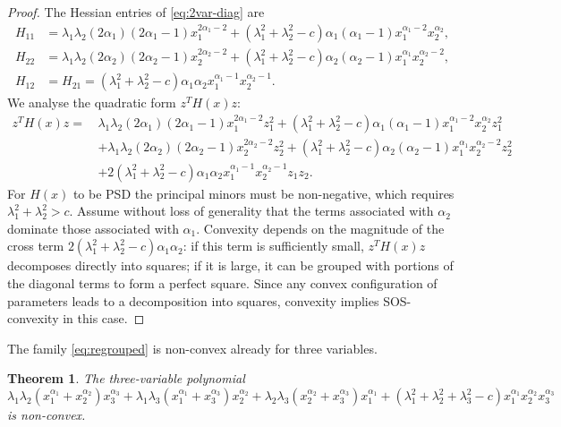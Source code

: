 \documentclass[12pt]{elsarticle}
\newtheorem{theorem}{Theorem}[section]
\theoremstyle{definition}
\begin{document}
\begin{proof}
The Hessian entries of \eqref{eq:2var-diag} are
\begin{equation}\label{eq:hessian-diag}
\begin{aligned}
H_{11} &= \lambda_1\lambda_2(2\alpha_1)(2\alpha_1 - 1)x_1^{2\alpha_1 - 2} + (\lambda_1^2 + \lambda_2^2 - c)\alpha_1(\alpha_1 - 1)x_1^{\alpha_1 - 2}x_2^{\alpha_2},\\
H_{22} &= \lambda_1\lambda_2(2\alpha_2)(2\alpha_2 - 1)x_2^{2\alpha_2 - 2} + (\lambda_1^2 + \lambda_2^2 - c)\alpha_2(\alpha_2 - 1)x_1^{\alpha_1}x_2^{\alpha_2 - 2},\\
H_{12}&=H_{21} = (\lambda_1^2 + \lambda_2^2 - c)\alpha_1\alpha_2 x_1^{\alpha_1 - 1}x_2^{\alpha_2 - 1}.
\end{aligned}
\end{equation}
We analyse the quadratic form $z^{T}H(x)z$:
\begin{equation}\label{eq:quadform}
    \begin{aligned}
        z^{T}H(x)z =\, & \lambda_1\lambda_2(2\alpha_1)(2\alpha_1 - 1)x_1^{2\alpha_1 - 2}z_1^{2} + (\lambda_1^2 + \lambda_2^2 - c)\alpha_1(\alpha_1 - 1)x_1^{\alpha_1 - 2}x_2^{\alpha_2}z_1^{2}\\
        &  + \lambda_1\lambda_2(2\alpha_2)(2\alpha_2 - 1)x_2^{2\alpha_2 - 2}z_2^{2} + (\lambda_1^2 + \lambda_2^2 - c)\alpha_2(\alpha_2 - 1)x_1^{\alpha_1}x_2^{\alpha_2 - 2}z_2^{2}\\
        & + 2(\lambda_1^2 + \lambda_2^2 - c)\alpha_1\alpha_2 x_1^{\alpha_1 - 1}x_2^{\alpha_2 - 1}z_1 z_2 .
    \end{aligned}
\end{equation}
For $H(x)$ to be PSD the principal minors must be non-negative, which requires $\lambda_1^2 + \lambda_2^2 > c$. Assume without loss of generality that the terms associated with $\alpha_2$ dominate those associated with $\alpha_1$. Convexity depends on the magnitude of the cross term $2(\lambda_1^2 + \lambda_2^2 - c)\alpha_1\alpha_2$: if this term is sufficiently small, $z^T H(x) z$ decomposes directly into squares; if it is large, it can be grouped with portions of the diagonal terms to form a perfect square. Since any convex configuration of parameters leads to a decomposition into squares, convexity implies SOS-convexity in this case.
\end{proof}

The family \eqref{eq:regrouped} is non-convex already for three variables.

\begin{theorem}\label{thm:nonconvex-3var}
The three-variable polynomial
\begin{equation}\label{eq:3var}
    \lambda_1\lambda_2(x_1^{\alpha_1} + x_2^{\alpha_2})x_3^{\alpha_3} + \lambda_1\lambda_3(x_1^{\alpha_1} + x_3^{\alpha_3})x_2^{\alpha_2} + \lambda_2\lambda_3(x_2^{\alpha_2} + x_3^{\alpha_3})x_1^{\alpha_1} +
    (\lambda_1^2 + \lambda_2^2 + \lambda_3^2 - c)x_1^{\alpha_1}x_2^{\alpha_2}x_3^{\alpha_3}
\end{equation}
is non-convex.
\end{theorem}
\end{document}
